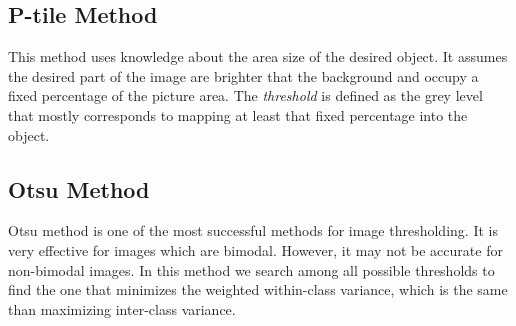 \documentclass[12]{article}
\begin{document}
\subsection{P-tile Method}
This method uses knowledge about the area size of the desired object. It assumes the desired part of the image are brighter that the background and occupy a fixed percentage of the picture area. The \textit{threshold} is defined as the grey level that mostly corresponds to mapping at least that fixed percentage into the object. 

\subsection{Otsu Method}
Otsu method is one of the most successful methods for image thresholding. It is very effective for images which are bimodal. However, it may not be accurate for non-bimodal images. In this method we search among all possible thresholds to find the one that minimizes the weighted within-class variance, which is the same than maximizing inter-class variance.
\end{document}
